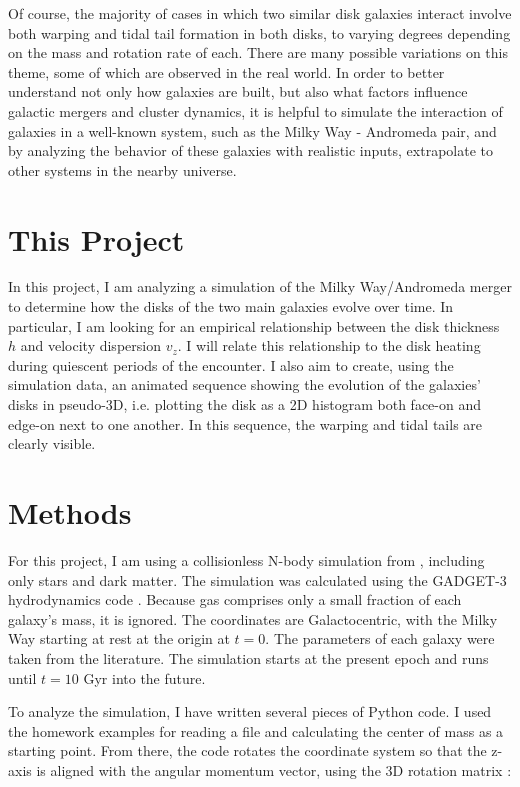 \documentclass[iop]{emulateapj}
\begin{document}
Of course, the majority of cases in which two similar disk galaxies interact involve both warping and tidal tail formation in both disks, to varying degrees depending on the mass and rotation rate of each. There are many possible variations on this theme, some of which are observed in the real world. In order to better understand not only how galaxies are built, but also what factors influence galactic mergers and cluster dynamics, it is helpful to simulate the interaction of galaxies in a well-known system, such as the Milky Way - Andromeda pair, and by analyzing the behavior of these galaxies with realistic inputs, extrapolate to other systems in the nearby universe.

\section{This Project}
In this project, I am analyzing a simulation of the Milky Way/Andromeda merger to determine how the disks of the two main galaxies evolve over time. In particular, I am looking for an empirical relationship between the disk thickness $h$ and velocity dispersion $v_z$. I will relate this relationship to the disk heating during quiescent periods of the encounter. I also aim to create, using the simulation data, an animated sequence showing the evolution of the galaxies' disks in pseudo-3D, i.e. plotting the disk as a 2D histogram both face-on and edge-on next to one another. In this sequence, the warping and tidal tails are clearly visible.

\section{Methods}
For this project, I am using a collisionless N-body simulation from \citet{van12}, including only stars and dark matter. The simulation was calculated using the GADGET-3 hydrodynamics code \citep{Spr05}. Because gas comprises only a small fraction of each galaxy's mass, it is ignored. The coordinates are Galactocentric, with the Milky Way starting at rest at the origin at $t=0$. The parameters of each galaxy were taken from the literature. The simulation starts at the present epoch and runs until $t=10$ Gyr into the future.

To analyze the simulation, I have written several pieces of Python code. I used the homework examples for reading a file and calculating the center of mass as a starting point. From there, the code rotates the coordinate system so that the z-axis is aligned with the angular momentum vector, using the 3D rotation matrix :
\end{document}
